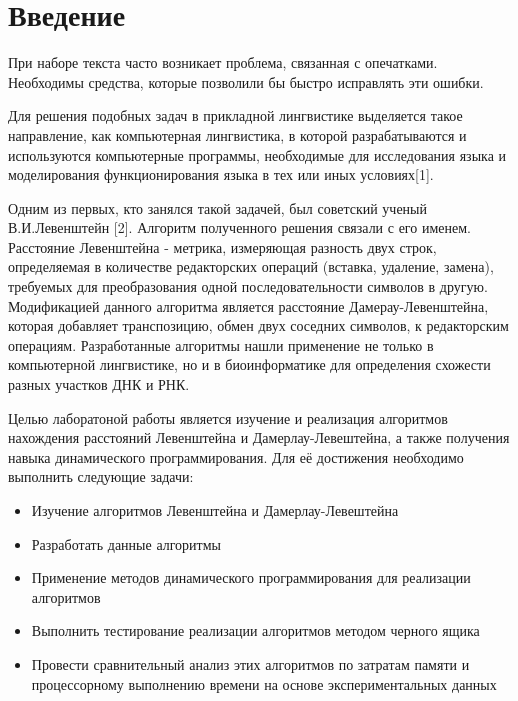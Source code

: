 \chapter*{Введение}
При наборе текста часто возникает проблема, связанная с опечатками. Необходимы средства, которые позволили бы быстро исправлять эти ошибки.

Для решения подобных задач в прикладной лингвистике выделяется такое направление, как компьютерная лингвистика, в которой разрабатываются и используются компьютерные программы, необходимые для исследования языка и моделирования функционирования языка в тех или иных условиях[1].

Одним из первых, кто занялся такой задачей, был советский ученый В.И.Левенштейн [2]. Алгоритм полученного решения связали с его именем. Расстояние Левенштейна - метрика, измеряющая разность двух строк, определяемая в количестве редакторских операций (вставка, удаление, замена), требуемых для преобразования одной последовательности символов в другую. Модификацией данного алгоритма является расстояние Дамерау-Левенштейна, которая добавляет транспозицию, обмен двух соседних символов, к редакторским операциям. Разработанные алгоритмы нашли применение не только в компьютерной лингвистике, но и в биоинформатике для определения схожести разных участков ДНК и РНК.

Целью лаборатоной работы является изучение и реализация алгоритмов нахождения расстояний Левенштейна и Дамерлау-Левештейна, а также получения навыка динамического программирования. Для её достижения необходимо выполнить следующие задачи:
\begin{itemize}
	\item Изучение алгоритмов Левенштейна и Дамерлау-Левештейна
	\item Разработать данные алгоритмы
	\item Применение методов динамического программирования для реализации алгоритмов
	\item Выполнить тестирование реализации алгоритмов методом черного ящика
	\item Провести сравнительный анализ этих алгоритмов по затратам памяти и процессорному выполнению времени на основе экспериментальных данных
\end{itemize}